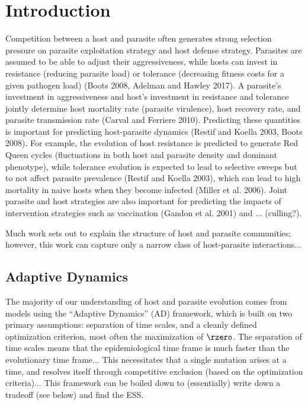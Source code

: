 \section*{Introduction}

Competition between a host and parasite often generates strong selection pressure on parasite exploitation strategy and host defense strategy. Parasites are assumed to be able to adjust their aggressiveness, while hosts can invest in resistance (reducing parasite load) or tolerance (decreasing fitness costs for a given pathogen load) (Boots 2008, Adelman and Hawley 2017). A parasite's investment in aggressiveness and host's investment in resistance and tolerance jointly determine host mortality rate (parasite virulence), host recovery rate, and parasite transmission rate (Carval and Ferriere 2010). Predicting these quantities is important for predicting host-parasite dynamics (Restif and Koella 2003, Boots 2008). For example, the evolution of host resistance is predicted to generate Red Queen cycles (fluctuations in both host and parasite density and dominant phenotype), while tolerance evolution is expected to lead to selective sweeps but to not affect parasite prevalence (Restif and Koella 2003), which can lead to high mortality in naive hosts when they become infected (Miller et al. 2006). Joint parasite and host strategies are also important for predicting the impacts of intervention strategies such as vaccination (Gandon et al. 2001)  and ... (culling?).

Much work sets out to explain the structure of host and parasite communities; however, this work can capture only a narrow class of host-parasite interactions... 

\subsection*{Adaptive Dynamics}

The majority of our understanding of host and parasite evolution comes from models using the ``Adaptive Dynamics'' (AD) framework, which is built on two primary assumptions: separation of time scales, and a cleanly defined optimization criterion, most often the maximization of $\rzero$. The separation of time scales means that the epidemiological time frame is much faster than the evolutionary time frame... This necessitates that a single mutation arises at a time, and resolves itself through competitive exclusion (based on the optimization criteria)... This framework can be boiled down to (essentially) write down a tradeoff (see below) and find the ESS. 

